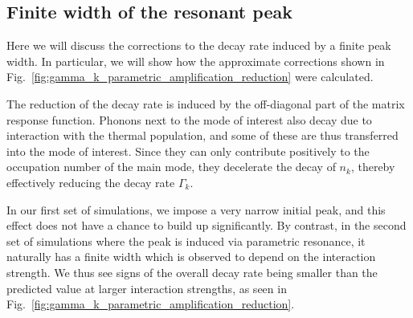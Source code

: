 \documentclass[aps,prd,notitlepage,amsfonts,amssymb,amsmath,nofootinbib,superscriptaddress,longbibliography]{revtex4-2}
\begin{document}
\begin{appendices}




\subsection{Finite width of the resonant peak \label{app:finite_width}}

Here we will discuss the corrections to the decay rate induced by a finite peak width.  In particular, we will show how the approximate corrections shown in Fig.~\ref{fig:gamma_k_parametric_amplification_reduction} were calculated.

The reduction of the decay rate is induced by the off-diagonal part of the matrix response function.  Phonons next to the mode of interest also decay due to interaction with the thermal population, and some of these are thus transferred into the mode of interest.  Since they can only contribute positively to the occupation number of the main mode, they decelerate the decay of $n_k$, thereby effectively reducing the decay rate $\Gamma_{k}$.

In our first set of simulations, we impose a very narrow initial peak, and this effect does not have a chance to build up significantly.  By contrast, in the second set of simulations where the peak is induced via parametric resonance, it naturally has a finite width which is observed to depend on the interaction strength.  We thus see signs of the overall decay rate being smaller than the predicted value at larger interaction strengths, as seen in Fig.~\ref{fig:gamma_k_parametric_amplification_reduction}.


\end{appendices}
\end{document}
